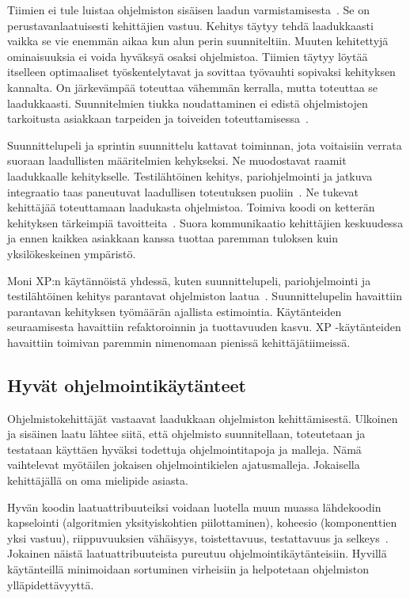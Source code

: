 \documentclass[finnish]{../tktltiki2}
\theoremstyle{definition}
\theoremstyle{remark}
\begin{document}
    Tiimien ei tule luistaa ohjelmiston sisäisen laadun varmistamisesta~\cite{Kn07}. Se on perustavanlaatuisesti 
kehittäjien vastuu. Kehitys täytyy tehdä laadukkaasti vaikka se vie enemmän aikaa kun alun perin suunniteltiin. Muuten 
kehitettyjä ominaisuuksia ei voida hyväksyä osaksi ohjelmistoa. Tiimien täytyy löytää itselleen optimaaliset 
työskentelytavat ja sovittaa työvauhti sopivaksi kehityksen kannalta. On järkevämpää toteuttaa vähemmän kerralla, mutta 
toteuttaa se laadukkaasti. Suunnitelmien tiukka noudattaminen ei edistä ohjelmistojen tarkoitusta asiakkaan tarpeiden ja 
toiveiden toteuttamisessa~\cite{HC01}.

    Suunnittelupeli ja sprintin suunnittelu kattavat toiminnan, jota voitaisiin verrata suoraan laadullisten
määritelmien kehykseksi. Ne muodostavat raamit laadukkaalle kehitykselle. Testilähtöinen kehitys, pariohjelmointi ja 
jatkuva integraatio taas paneutuvat laadullisen toteutuksen puoliin~\cite{SS10}. Ne tukevat kehittäjää toteuttamaan 
laadukasta ohjelmistoa. Toimiva koodi on ketterän kehityksen tärkeimpiä tavoitteita~\cite{HC01}. Suora kommunikaatio 
kehittäjien keskuudessa ja ennen kaikkea asiakkaan kanssa tuottaa paremman tuloksen kuin yksilökeskeinen ympäristö.

    Moni XP:n käytännöistä yhdessä, kuten suunnittelupeli, pariohjelmointi ja testilähtöinen kehitys parantavat 
ohjelmiston laatua~\cite{SS10}. Suunnittelupelin havaittiin parantavan kehityksen työmäärän ajallista estimointia. 
Käytänteiden seuraamisesta havaittiin refaktoroinnin ja tuottavuuden kasvu. XP -käytänteiden havaittiin toimivan 
paremmin nimenomaan pienissä kehittäjätiimeissä.

\subsection{Hyvät ohjelmointikäytänteet}

Ohjelmistokehittäjät vastaavat laadukkaan ohjelmiston kehittämisestä. Ulkoinen ja sisäinen laatu lähtee siitä, että 
ohjelmisto suunnitellaan, toteutetaan ja testataan käyttäen hyväksi todettuja ohjelmointitapoja ja malleja. Nämä 
vaihtelevat myötäilen jokaisen ohjelmointikielen ajatusmalleja. Jokaisella kehittäjällä on oma mielipide asiasta.

    Hyvän koodin laatuattribuuteiksi voidaan luotella muun muassa lähdekoodin kapselointi (algoritmien yksityiskohtien 
piilottaminen), koheesio (komponenttien yksi vastuu), riippuvuuksien vähäisyys, toistettavuus, testattavuus ja 
selkeys~\cite{Sc08}. Jokainen näistä laatuattribuuteista pureutuu ohjelmointikäytänteisiin. Hyvillä käytänteillä 
minimoidaan sortuminen virheisiin ja helpotetaan ohjelmiston ylläpidettävyyttä.
\end{document}
